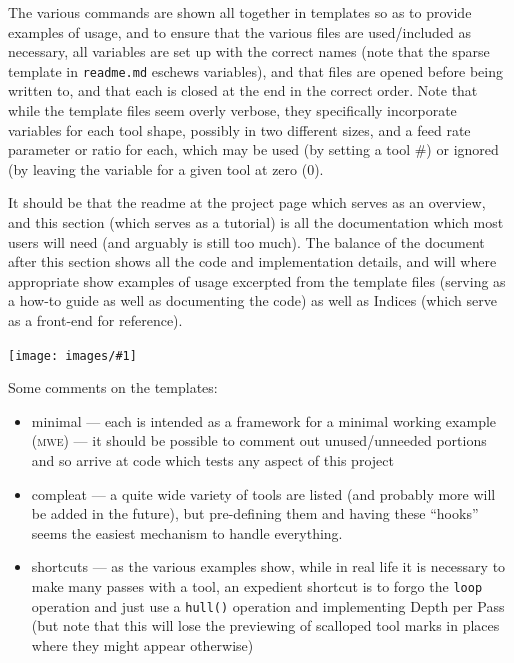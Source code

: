 \documentclass{ltxdoc}
\newcommand{\includeimage}[1]{\bigskip\noindent\texttt{[image: images/\#1]}\bigskip}
\begin{document}
The various commands are shown all together in templates so as to provide examples of usage, and to ensure that the various files are used/included as necessary, all variables are set up with the correct names (note that the sparse template in \verb|readme.md| eschews variables), and that files are opened before being written to, and that each is closed at the end in the correct order. Note that while the template files seem overly verbose, they specifically incorporate variables for each tool shape, possibly in two different sizes, and a feed rate parameter or ratio for each, which may be used (by setting a tool \#) or ignored (by leaving the variable for a given tool at zero (0). 

It should be that the readme at the project page which serves as an overview, and this section (which serves as a tutorial) is all the documentation which most users will need (and arguably is still too much). 
The balance of the document after this section shows all the code and implementation details, and will where appropriate show examples of usage excerpted from the template files (serving as a how-to guide as well as documenting the code) as well as Indices (which serve as a front-end for reference).

\includeimage{panorama.pdf}


Some comments on the templates:

\begin{itemize}
\item minimal --- each is intended as a framework for a minimal working example (\textsc{mwe}) --- it should be possible to comment out unused/unneeded portions and so arrive at code which tests any aspect of this project
\item compleat --- a quite wide variety of tools are listed (and probably more will be
                   added in the future), but pre-defining them and having these ``hooks''
                   seems the easiest mechanism to handle everything. 
\item shortcuts --- as the various examples show, while in real life it is necessary to 
                    make many passes with a tool, an expedient shortcut is to forgo the 
                    \verb|loop| operation and just use a \verb|hull()| operation and implementing 
                    Depth per Pass (but note that this will lose the previewing of scalloped tool 
                    marks in places where they might appear otherwise)
\end{itemize}
\end{document}
